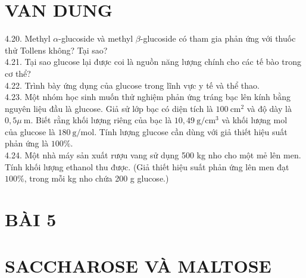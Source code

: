 \documentclass[10pt]{article}
\begin{document}
\section*{VAN DUNG}
4.20. Methyl $\alpha$-glucoside và methyl $\beta$-glucoside có tham gia phản ứng với thuốc thử Tollens không? Tại sao?\\
4.21. Tại sao glucose lại được coi là nguồn năng lượng chính cho các tế bào trong cơ thể?\\
4.22. Trình bày ứng dụng của glucose trong lĩnh vực y tế và thể thao.\\
4.23. Một nhóm học sinh muốn thử nghiệm phản ứng tráng bạc lên kính bằng nguyên liệu đầu là glucose. Giả sử lớp bạc có diện tích là $100 \mathrm{~cm}^{2}$ và độ dày là $0,5 \mu \mathrm{~m}$. Biết rằng khối lượng riêng của bạc là $10,49 \mathrm{~g} / \mathrm{cm}^{3}$ và khối lượng mol\\
của glucose là $180 \mathrm{~g} / \mathrm{mol}$. Tính lượng glucose cần dùng với giả thiết hiệu suất phản ứng là $100 \%$.\\
4.24. Một nhà máy sản xuất rượu vang sử dụng 500 kg nho cho một mẻ lên men. Tính khối lượng ethanol thu được. (Giả thiết hiệu suất phản ứng lên men đạt $100 \%$, trong mỗi kg nho chứa 200 g glucose.)

\section*{BÀI 5}
\section*{SACCHAROSE VÀ MALTOSE}
\end{document}
